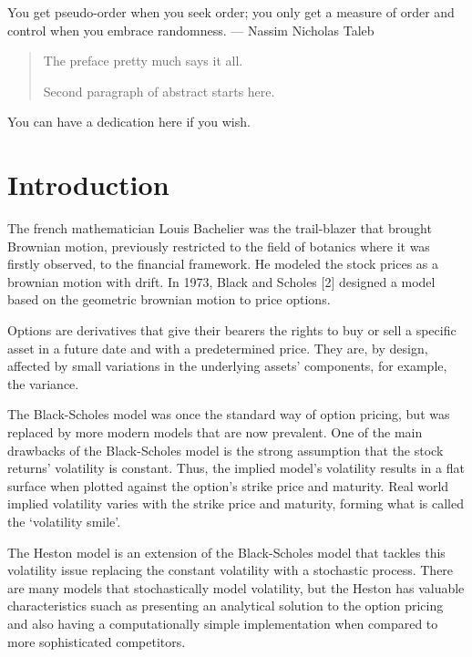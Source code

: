 \documentclass[12pt,twoside]{reedthesis}
\theoremstyle{definition}
\theoremstyle{definition}
\theoremstyle{remark}
\begin{document}
\begin{acknowledgements}
      You get pseudo-order when you seek order; you only get a measure of
      order and control when you embrace randomness. --- Nassim Nicholas Taleb
    \end{acknowledgements}
  
      \hypersetup{linkcolor=black}
    \setcounter{tocdepth}{2}
    \tableofcontents
  
      \listoftables
  
      \listoffigures
      \begin{abstract}
      The preface pretty much says it all. \par  Second paragraph of abstract
      starts here.
    \end{abstract}
      \begin{dedication}
      You can have a dedication here if you wish.
    \end{dedication}
  \mainmatter %
  \pagestyle{fancyplain} %

  \chapter{Introduction}\label{intro}
  
  The french mathematician Louis Bachelier was the trail-blazer that
  brought Brownian motion, previously restricted to the field of botanics
  where it was firstly observed, to the financial framework. He modeled
  the stock prices as a brownian motion with drift. In 1973, Black and
  Scholes {[}2{]} designed a model based on the geometric brownian motion
  to price options.
  
  Options are derivatives that give their bearers the rights to buy or
  sell a specific asset in a future date and with a predetermined price.
  They are, by design, affected by small variations in the underlying
  assets' components, for example, the variance.
  
  The Black-Scholes model was once the standard way of option pricing, but
  was replaced by more modern models that are now prevalent. One of the
  main drawbacks of the Black-Scholes model is the strong assumption that
  the stock returns' volatility is constant. Thus, the implied model's
  volatility results in a flat surface when plotted against the option's
  strike price and maturity. Real world implied volatility varies with the
  strike price and maturity, forming what is called the `volatility
  smile'.
  
  The Heston model is an extension of the Black-Scholes model that tackles
  this volatility issue replacing the constant volatility with a
  stochastic process. There are many models that stochastically model
  volatility, but the Heston has valuable characteristics suach as
  presenting an analytical solution to the option pricing and also having
  a computationally simple implementation when compared to more
  sophisticated competitors.
  
\end{document}
